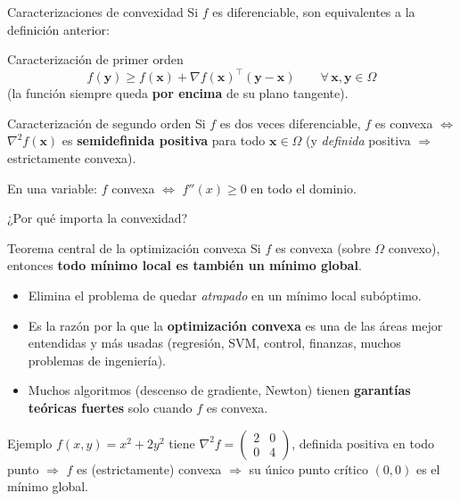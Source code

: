 \documentclass[aspectratio=169,10pt]{beamer}
\newcommand{\grad}{\nabla}
\newcommand{\x}{\mathbf{x}}
\newcommand{\Hess}{\nabla^2 f}
\begin{document}
\begin{frame}{Caracterizaciones de convexidad}
  Si $f$ es diferenciable, son equivalentes a la definición anterior:
  \begin{block}{Caracterización de primer orden}
    \[
      f(\mathbf{y}) \ge f(\x) + \grad f(\x)^\top(\mathbf{y}-\x)
      \qquad \forall\, \x,\mathbf y \in \Omega
    \]
    (la función siempre queda \textbf{por encima} de su plano tangente).
  \end{block}
  \begin{block}{Caracterización de segundo orden}
    Si $f$ es dos veces diferenciable, $f$ es convexa
    $\Leftrightarrow$ $\Hess(\x)$ es \textbf{semidefinida positiva} para
    todo $\x\in\Omega$ (y \emph{definida} positiva $\Rightarrow$
    estrictamente convexa).
  \end{block}
  \small En una variable: $f$ convexa $\Leftrightarrow$ $f''(x)\ge 0$ en
  todo el dominio.
\end{frame}

\begin{frame}{¿Por qué importa la convexidad?}
  \begin{alertblock}{Teorema central de la optimización convexa}
    Si $f$ es convexa (sobre $\Omega$ convexo), entonces \textbf{todo mínimo
    local es también un mínimo global}.
  \end{alertblock}
  \begin{itemize}
    \item Elimina el problema de quedar \emph{atrapado} en un mínimo local
      subóptimo.
    \item Es la razón por la que la \textbf{optimización convexa} es una
      de las áreas mejor entendidas y más usadas (regresión, SVM, control,
      finanzas, muchos problemas de ingeniería).
    \item Muchos algoritmos (descenso de gradiente, Newton) tienen
      \textbf{garantías teóricas fuertes} solo cuando $f$ es convexa.
  \end{itemize}
  \begin{exampleblock}{Ejemplo}
    $f(x,y)=x^2+2y^2$ tiene $\Hess=\begin{pmatrix}2&0\\0&4\end{pmatrix}$,
    definida positiva en todo punto $\Rightarrow$ $f$ es (estrictamente)
    convexa $\Rightarrow$ su único punto crítico $(0,0)$ es el mínimo
    global.
  \end{exampleblock}
\end{frame}
\end{document}
